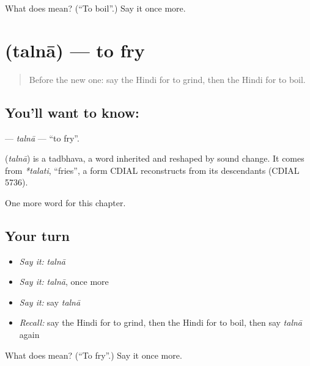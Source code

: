 \begin{tcolorbox}[breakable,colback=teal!4,colframe=teal!35!black,title={Before you move on}]
What does  mean? (\textquotedblleft{}To boil\textquotedblright{}.) Say it once more.
\end{tcolorbox}
\section[\texorpdfstring{\hi{तलना} (talnā)}{तलना (talnā)}]{ (talnā) — to fry}

\label{lesson:HI-C177-talna}



\begin{quote}
Before the new one: say the Hindi for to grind, then the Hindi for to boil.
\end{quote}

\subsection*{You'll want to know: }
\textbf{} — \emph{talnā} — \textquotedblleft{}to fry\textquotedblright{}.

\begin{cousinweb}
\textbf{} (\emph{talnā}) is a tadbhava, a word inherited and reshaped by sound change. It comes from \emph{*talati}, \textquotedblleft{}fries\textquotedblright{}, a form CDIAL reconstructs from its descendants (CDIAL 5736).
\end{cousinweb}

\begin{grammarlens}[title={What you've built}]
One more word for this chapter.
\end{grammarlens}

\subsection*{Your turn}
\begin{itemize}
\raggedright
  \item \emph{Say it:} \emph{talnā}
  \item \emph{Say it:} \emph{talnā}, once more
  \item \emph{Say it:} say \emph{talnā}
  \item \emph{Recall:} say the Hindi for to grind, then the Hindi for to boil, then say \emph{talnā} again
\end{itemize}

\begin{tcolorbox}[breakable,colback=teal!4,colframe=teal!35!black,title={Before you move on}]
What does  mean? (\textquotedblleft{}To fry\textquotedblright{}.) Say it once more.
\end{tcolorbox}
